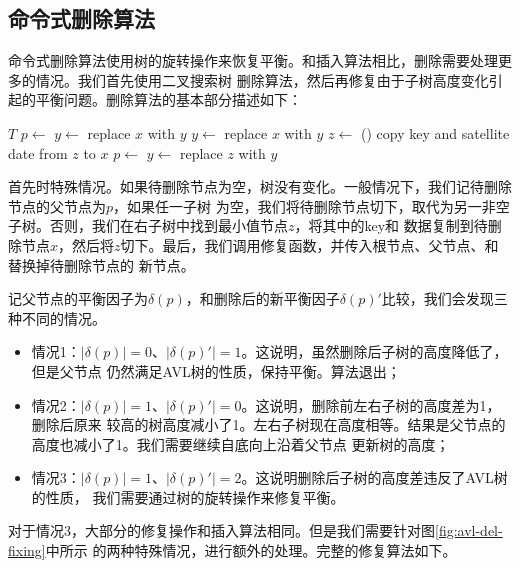\documentclass{ctexart}
\begin{document}
\subsection{命令式删除算法}

命令式删除算法使用树的旋转操作来恢复平衡。和插入算法相比，删除需要处理更多的情况。我们首先使用二叉搜索树
删除算法，然后再修复由于子树高度变化引起的平衡问题。删除算法的基本部分描述如下：

\begin{algorithmic}[1]
    \State \Return $T$
  \EndIf
  \State $p \gets$ 
    \State $y \gets $ 
    \State replace $x$ with $y$
    \State $y \gets $ 
    \State replace $x$ with $y$
  \Else
    \State $z \gets$ ()
    \State copy key and satellite date from $z$ to $x$
    \State $p \gets$ 
    \State $y \gets$ 
    \State replace $z$ with $y$
  \EndIf
  \State \Return {}
\EndFunction
\end{algorithmic}

首先时特殊情况。如果待删除节点为空，树没有变化。一般情况下，我们记待删除节点的父节点为$p$，如果任一子树
为空，我们将待删除节点切下，取代为另一非空子树。否则，我们在右子树中找到最小值节点$z$，将其中的key和
数据复制到待删除节点$x$，然后将$z$切下。最后，我们调用修复函数，并传入根节点、父节点、和替换掉待删除节点的
新节点。

记父节点的平衡因子为$\delta(p)$，和删除后的新平衡因子$\delta(p)'$比较，我们会发现三种不同的情况。

\begin{itemize}
\item 情况1：$|\delta(p)| = 0$、$|\delta(p)'| = 1$。这说明，虽然删除后子树的高度降低了，但是父节点
仍然满足AVL树的性质，保持平衡。算法退出；
\item 情况2：$|\delta(p)| = 1$、$|\delta(p)'| = 0$。这说明，删除前左右子树的高度差为1，删除后原来
较高的树高度减小了1。左右子树现在高度相等。结果是父节点的高度也减小了1。我们需要继续自底向上沿着父节点
更新树的高度；
\item 情况3：$|\delta(p)| = 1$、$|\delta(p)'| = 2$。这说明删除后子树的高度差违反了AVL树的性质，
我们需要通过树的旋转操作来修复平衡。
\end{itemize}

对于情况3，大部分的修复操作和插入算法相同。但是我们需要针对图\ref{fig:avl-del-fixing}中所示
的两种特殊情况，进行额外的处理。完整的修复算法如下。
\end{document}
